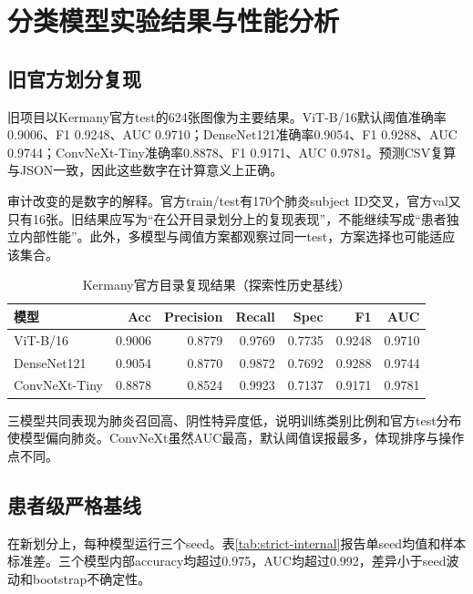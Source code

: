 \chapter{分类模型实验结果与性能分析}

\section{旧官方划分复现}

旧项目以Kermany官方test的624张图像为主要结果。ViT-B/16默认阈值准确率0.9006、F1 0.9248、AUC 0.9710；DenseNet121准确率0.9054、F1 0.9288、AUC 0.9744；ConvNeXt-Tiny准确率0.8878、F1 0.9171、AUC 0.9781。预测CSV复算与JSON一致，因此这些数字在计算意义上正确。

审计改变的是数字的解释。官方train/test有170个肺炎subject ID交叉，官方val又只有16张。旧结果应写为“在公开目录划分上的复现表现”，不能继续写成“患者独立内部性能”。此外，多模型与阈值方案都观察过同一test，方案选择也可能适应该集合。

\begin{table}[H]
\centering
\caption{Kermany官方目录复现结果（探索性历史基线）}
\begin{tabular}{lrrrrrr}
\toprule 模型 & Acc & Precision & Recall & Spec & F1 & AUC\\\midrule
ViT-B/16 & 0.9006 & 0.8779 & 0.9769 & 0.7735 & 0.9248 & 0.9710\\
DenseNet121 & 0.9054 & 0.8770 & 0.9872 & 0.7692 & 0.9288 & 0.9744\\
ConvNeXt-Tiny & 0.8878 & 0.8524 & 0.9923 & 0.7137 & 0.9171 & 0.9781\\\bottomrule
\end{tabular}
\end{table}

三模型共同表现为肺炎召回高、阴性特异度低，说明训练类别比例和官方test分布使模型偏向肺炎。ConvNeXt虽然AUC最高，默认阈值误报最多，体现排序与操作点不同。

\section{患者级严格基线}

在新划分上，每种模型运行三个seed。表\ref{tab:strict-internal}报告单seed均值和样本标准差。三个模型内部accuracy均超过0.975，AUC均超过0.992，差异小于seed波动和bootstrap不确定性。

\begin{table}[H]
\centering
\caption{患者级locked test三seed结果（均值$\pm$标准差）}
\label{tab:strict-internal}
\end{table}

